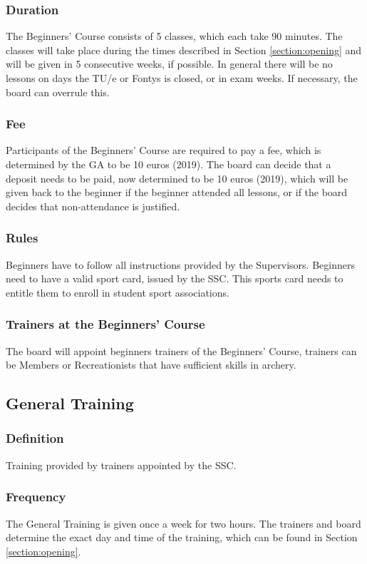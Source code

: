 \documentclass[a4paper]{article}
\begin{document}
\subsubsection{Duration}
The Beginners' Course consists of 5 classes, which each take 90 minutes. The classes will take place during the times described in Section \ref{section:opening} and will be given in 5 consecutive weeks, if possible. In general there will be no lessons on days the TU/e or Fontys is closed, or in exam weeks. If necessary, the board can overrule this.

\subsubsection{Fee}
Participants of the Beginners' Course are required to pay a fee, which is determined by the GA to be 10 euros {\g (2019)}. The board can decide that a deposit needs to be paid, now determined to be 10 euros {\g (2019)}, which will be given back to the beginner if the beginner attended all lessons, or if the board decides that non-attendance is justified.

\subsubsection{Rules}
Beginners have to follow all instructions provided by the Supervisors. Beginners need to have a valid sport card, issued by the SSC. This sports card needs to entitle them to enroll in student sport associations.

\subsubsection{Trainers at the Beginners' Course}
The board will appoint beginners trainers of the Beginners' Course, trainers can be Members or Recreationists that have sufficient skills in archery.

\subsection{General Training}
\subsubsection{Definition}
Training provided by trainers appointed by the SSC.

\subsubsection{Frequency}
The General Training is given once a week for two hours. The trainers and board determine the exact day and time of the training, which can be found in Section \ref{section:opening}.
\end{document}
